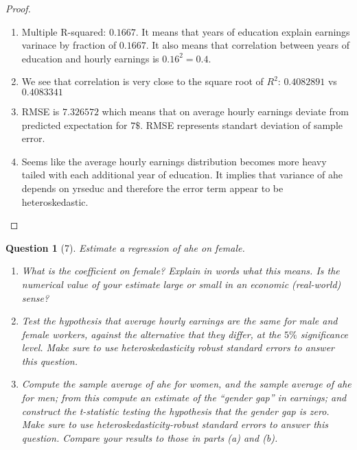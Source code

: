 \documentclass[12pt,reqno]{amsart}
\theoremstyle{plain}
\newtheorem*{theorem*}{Question}
\begin{document}
\begin{proof}
\begin{enumerate}
        \item Multiple R-squared: $0.1667$. It means that years of education explain earnings
              varinace by fraction of $0.1667$. It also means that correlation between
              years of education and hourly earnings is $0.16^2 = 0.4$.
        \item We see that correlation is very close to the square root of $R^2$:
              $0.4082891$ vs $0.4083341$
        \item RMSE is $7.326572$ which means that on average hourly earnings deviate from predicted
              expectation for $ 7\$ $. RMSE represents standart deviation of sample error.
        \item Seems like the average hourly earnings distribution becomes more
              heavy tailed with each additional year of education. It implies that variance
              of ahe depends on yrseduc and therefore the error term appear to be
              heteroskedastic.
    \end{enumerate}
\end{proof}
\begin{theorem*}[7]
    \normalfont
    Estimate a regression of ahe on female.
    \begin{enumerate}
        \item What is the coefficient on female? Explain in words what this means. Is the numerical
              value of your estimate large or small in an economic (real-world) sense?
        \item Test the hypothesis that average hourly earnings are the same for male and female
              workers, against the alternative that they differ, at the $ 5\% $  significance level.
              Make sure to use heteroskedasticity robust standard errors to answer this question.
        \item Compute the sample average of ahe for women, and the sample average of ahe for men;
              from this compute an estimate of the “gender gap” in earnings; and construct the t-statistic
              testing the hypothesis that the gender gap is zero. Make sure to use heteroskedasticity-robust
              standard errors to answer this question. Compare your results to those in parts (a) and (b).
    \end{enumerate}
\end{theorem*}
\end{document}
